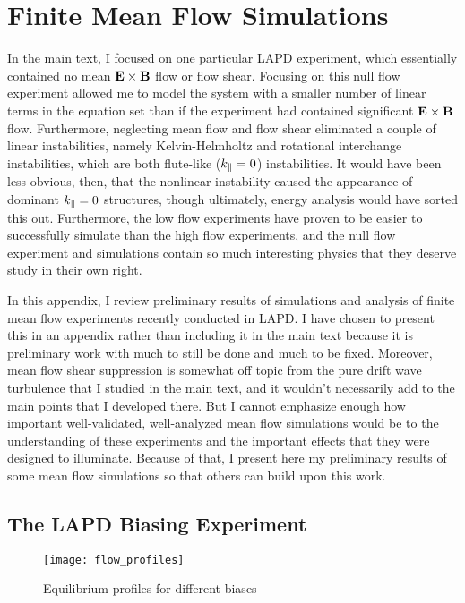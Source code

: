 \chapter{Finite Mean Flow Simulations}
\label{app_mean_flow}

In the main text, I focused on one particular LAPD experiment, which essentially contained no mean ${\bf E \times B}$ flow or flow shear. Focusing on this null flow experiment
allowed me to model the system with a smaller number of linear terms in the equation set than if the experiment had contained significant ${\bf E \times B}$ flow. 
Furthermore, neglecting mean flow and flow shear eliminated a couple of linear instabilities, namely Kelvin-Helmholtz
and rotational interchange instabilities, which are both flute-like ($k_{\parallel} = 0$) instabilities. It would have been less obvious, then, that the nonlinear instability caused the appearance
of dominant $k_{\parallel} = 0$ structures, though ultimately, energy analysis would have sorted this out. Furthermore, the low flow experiments have proven to be easier to successfully simulate than
the high flow experiments, and the null flow experiment and simulations contain so much interesting physics that they deserve study in their own right.

In this appendix, I review preliminary results of simulations and analysis of finite mean flow experiments recently conducted in LAPD. 
I have chosen to present this in an appendix rather than including it in the main text because it is preliminary work with much to still be done and much to be fixed. 
Moreover, mean flow shear suppression is somewhat off topic from the pure drift wave turbulence that I studied in the main
text, and it wouldn't necessarily add to the main points that I developed there. But I cannot emphasize enough how important well-validated, well-analyzed mean flow simulations would be
to the understanding of these experiments and the important effects that they were designed to illuminate. Because of that, I present here my preliminary results of some mean flow simulations
so that others can build upon this work.


\section{The LAPD Biasing Experiment}
\label{s_biasing_exp}

\begin{figure}[!ht]
\centerline{\texttt{[image: flow\_profiles]}}
\caption{Equilibrium profiles for different biases}
\label{flow_profiles}
\end{figure}

